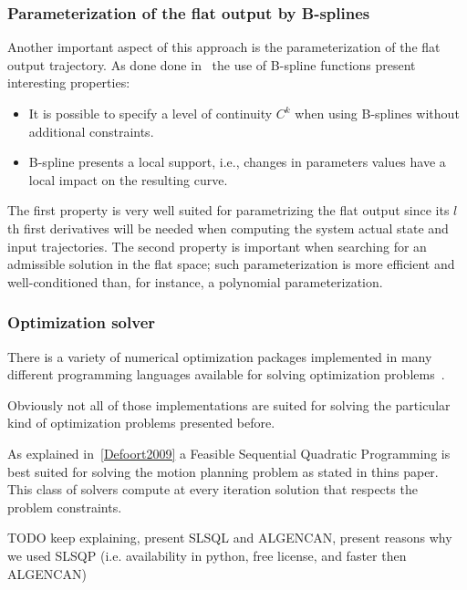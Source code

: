 \documentclass[eprint]{actapoly}
\begin{document}
\subsubsection{Parameterization of the flat output by B-splines}

Another important aspect of this approach is the parameterization of 
the flat output trajectory. As done done in~\cite{milam2003} the use
of B-spline functions present interesting properties:


\begin{itemize}


 \item It is possible to specify a level of continuity $C^k$ when using B-splines without
 additional constraints.
 
 \item B-spline presents a local support, i.e., changes in parameters values have a local
 impact on the resulting curve.
 
 
\end{itemize}

The first property is very well suited for parametrizing the flat output since
its $l$th first derivatives will be needed when computing the system actual state
and input trajectories. The second property is important when searching for an
admissible solution in the flat space; such parameterization is more efficient
and well-conditioned than, for instance, a polynomial parameterization.

\subsubsection{Optimization solver}

There is a variety of numerical optimization packages implemented in many different programming languages available for solving optimization problems~\cite{pyopt-paper}.

Obviously not all of those implementations are suited for solving
the particular kind of optimization problems presented before.

As explained in~\ref{Defoort2009} a Feasible Sequential Quadratic Programming is best suited for solving the motion
planning problem as stated in thins paper. 
This class of solvers compute at every iteration solution
that respects the problem constraints.

TODO keep explaining, present SLSQL and ALGENCAN, present reasons why we used SLSQP (i.e. availability in python, free license, and faster then ALGENCAN)
\end{document}
